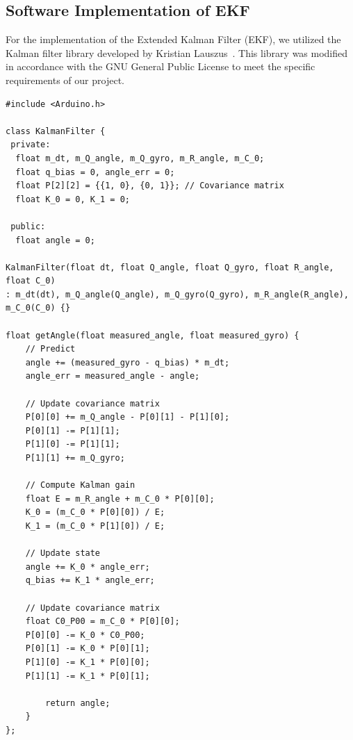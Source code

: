 \subsection{Software Implementation of EKF}
For the implementation of the Extended Kalman Filter (EKF), we utilized the Kalman filter library developed by Kristian Lauszus~\cite{github_kalman_filter}. This library was modified in accordance with the GNU General Public License to meet the specific requirements of our project.
\begin{lstlisting}[style=cppstyle2]
#include <Arduino.h>

class KalmanFilter {
 private:
  float m_dt, m_Q_angle, m_Q_gyro, m_R_angle, m_C_0;
  float q_bias = 0, angle_err = 0;
  float P[2][2] = {{1, 0}, {0, 1}}; // Covariance matrix
  float K_0 = 0, K_1 = 0;

 public:
  float angle = 0;

KalmanFilter(float dt, float Q_angle, float Q_gyro, float R_angle, float C_0)
: m_dt(dt), m_Q_angle(Q_angle), m_Q_gyro(Q_gyro), m_R_angle(R_angle), m_C_0(C_0) {}

float getAngle(float measured_angle, float measured_gyro) {
	// Predict
	angle += (measured_gyro - q_bias) * m_dt;
	angle_err = measured_angle - angle;
	
	// Update covariance matrix
	P[0][0] += m_Q_angle - P[0][1] - P[1][0];
	P[0][1] -= P[1][1];
	P[1][0] -= P[1][1];
	P[1][1] += m_Q_gyro;
	
	// Compute Kalman gain
	float E = m_R_angle + m_C_0 * P[0][0];
	K_0 = (m_C_0 * P[0][0]) / E;
	K_1 = (m_C_0 * P[1][0]) / E;
	
	// Update state
	angle += K_0 * angle_err;
	q_bias += K_1 * angle_err;
	
	// Update covariance matrix
	float C0_P00 = m_C_0 * P[0][0];
	P[0][0] -= K_0 * C0_P00;
	P[0][1] -= K_0 * P[0][1];
	P[1][0] -= K_1 * P[0][0];
	P[1][1] -= K_1 * P[0][1];
	
		return angle;
	}
};
\end{lstlisting}